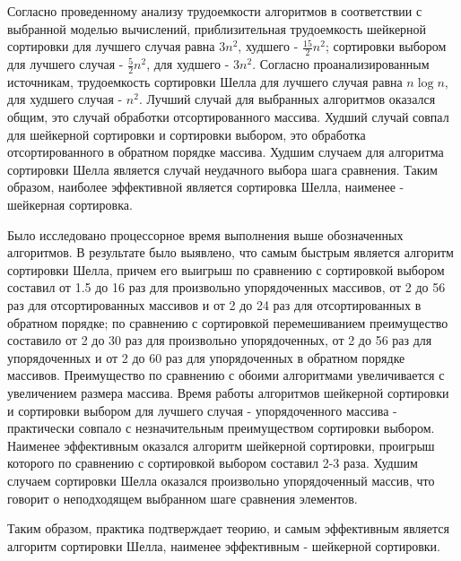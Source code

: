 \documentclass[12pt]{report}
\begin{document}
    Согласно проведенному анализу трудоемкости алгоритмов в соответствии с выбранной моделью вычислений,
    приблизительная трудоемкость шейкерной сортировки для лучшего случая равна $3n^2$, худшего - $\frac{15}{2}n^2$;
    сортировки выбором для лучшего случая - $\frac{5}{2}n^2$, для худшего - $3n^2$.
    Согласно проанализированным источникам, трудоемкость сортировки Шелла
    для лучшего случая равна $n \log n$, для худшего случая - $n^2$.
    Лучший случай для выбранных алгоритмов оказался общим, это случай обработки отсортированного массива.
    Худший случай совпал для шейкерной сортировки и сортировки выбором,
    это обработка отсортированного в обратном порядке массива.
    Худшим случаем для алгоритма сортировки Шелла является случай неудачного выбора шага сравнения.
    Таким образом, наиболее эффективной является сортировка Шелла, наименее - шейкерная сортировка.

    Было исследовано процессорное время выполнения выше обозначенных алгоритмов.
    В результате было выявлено, что самым быстрым является алгоритм сортировки Шелла,
    причем его выигрыш по сравнению с сортировкой выбором составил
    от 1.5 до 16 раз для произвольно упорядоченных массивов,
    от 2 до 56 раз для отсортированных массивов и от 2 до 24 раз для отсортированных в обратном порядке;
    по сравнению с сортировкой перемешиванием преимущество составило от 2 до 30 раз для произвольно упорядоченных,
    от 2 до 56 раз для упорядоченных и от 2 до 60 раз для упорядоченных в обратном порядке массивов.
    Преимущество по сравнению с обоими алгоритмами увеличивается с увеличением размера массива.
    Время работы алгоритмов шейкерной сортировки и сортировки выбором для лучшего случая -
    упорядоченного массива - практически совпало с незначительным преимуществом сортировки выбором.
    Наименее эффективным оказался алгоритм шейкерной сортировки,
    проигрыш которого по сравнению с сортировкой выбором составил 2-3 раза.
    Худшим случаем сортировки Шелла оказался произвольно упорядоченный массив,
    что говорит о неподходящем выбранном шаге сравнения элементов.

    Таким образом, практика подтверждает теорию, и самым эффективным является алгоритм сортировки Шелла,
    наименее эффективным - шейкерной сортировки.

    \newpage

    
    
\end{document}
